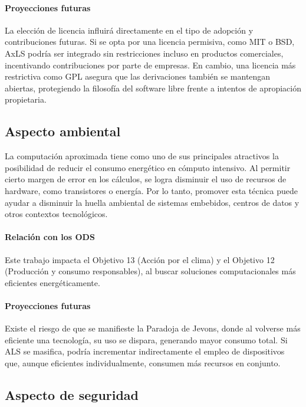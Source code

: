 \paragraph{Proyecciones futuras}
La elección de licencia influirá directamente en el tipo de adopción y
contribuciones futuras. Si se opta por una licencia permisiva, como MIT o BSD,
AxLS podría ser integrado sin restricciones incluso en productos comerciales,
incentivando contribuciones por parte de empresas. En cambio, una licencia más
restrictiva como GPL asegura que las derivaciones también se mantengan
abiertas, protegiendo la filosofía del software libre frente a intentos de
apropiación propietaria.

\subsection{Aspecto ambiental}

La computación aproximada tiene como uno de sus principales atractivos la
posibilidad de reducir el consumo energético en cómputo intensivo. Al permitir
cierto margen de error en los cálculos, se logra disminuir el uso de recursos
de hardware, como transistores o energía. Por lo tanto, promover esta técnica
puede ayudar a disminuir la huella ambiental de sistemas embebidos, centros de
datos y otros contextos tecnológicos.

\paragraph{Relación con los ODS}
Este trabajo impacta el Objetivo 13 (Acción por el clima) y el Objetivo 12
(Producción y consumo responsables), al buscar soluciones computacionales más
eficientes energéticamente.

\paragraph{Proyecciones futuras}
Existe el riesgo de que se manifieste la Paradoja de Jevons, donde al volverse
más eficiente una tecnología, su uso se dispara, generando mayor consumo total.
Si ALS se masifica, podría incrementar indirectamente el empleo de dispositivos
que, aunque eficientes individualmente, consumen más recursos en conjunto.

\subsection{Aspecto de seguridad}

